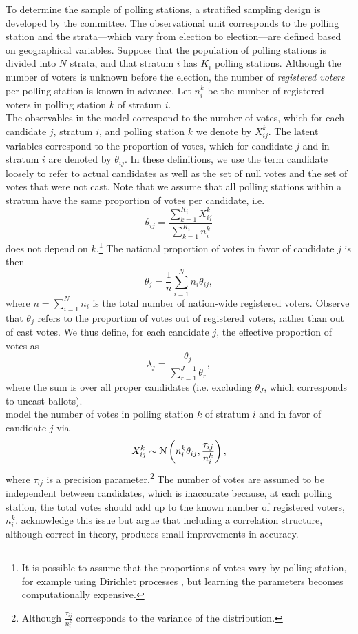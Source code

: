 \documentclass{article}
\begin{document}
To determine the sample of polling stations, a stratified sampling design is developed by the committee. The observational unit corresponds to the polling station and the strata---which vary from election to election---are defined based on geographical variables. Suppose that the population of polling stations is divided into $N$ strata, and that stratum $i$ has $K_i$ polling stations. Although the number of voters is unknown before the election, the number of \textit{registered voters} per polling station is known in advance. Let $n_i^k$ be the number of registered voters in polling station $k$ of stratum $i$. \\

The observables in the model correspond to the number of votes, which for each candidate $j$, stratum $i$, and polling station $k$ we denote by $X_{ij}^k$. The latent variables correspond to the proportion of votes, which for candidate $j$ and in stratum $i$ are denoted by $\theta_{ij}$. In these definitions, we use the term candidate loosely to refer to actual candidates as well as the set of null votes and the set of votes that were not cast. Note that we assume that all polling stations within a stratum have the same proportion of votes per candidate, i.e.
\[
\theta_{ij} = \frac{\sum_{k=1}^{K_i} X_{ij}^k}{\sum_{k=1}^{K_i} n_{i}^k}
\]
does not depend on $k$.\footnote{It is possible to assume that the proportions of votes vary by polling station, for example using Dirichlet processes \citep[see][]{lo1984class, nieto2018}, but learning the parameters becomes computationally expensive.} The national proportion of votes in favor of candidate $j$ is then
\[
  \theta_j = \frac{1}{n} \sum_{i=1}^N n_i \theta_{ij}, \label{eq:thetaj}
\]
where $n = \sum_{i=1}^N n_i$ is the total number of nation-wide registered voters. Observe that $\theta_j$ refers to the proportion of votes out of registered voters, rather than out of cast votes. We thus define, for each candidate $j$, the effective proportion of votes as
\[
  \lambda_j = \frac{\theta_j}{\sum_{r = 1}^{J-1} \theta_r},  \label{eq:lambdaj}
\]
where the sum is over all proper candidates (i.e. excluding $\theta_J$, which corresponds to uncast ballots). \\



\citet{mendoza-nieto2016} model the number of votes in polling station $k$ of stratum $i$ and in favor of candidate $j$ via
\[
  X_{ij}^k \sim \mathcal{N} \left( n_i^k \theta_{ij}, \frac{\tau_{ij}}{n_i^k} \right), \label{eq:original_likelihood}
\]
where $\tau_{ij}$ is a precision parameter.\footnote{Although $\frac{\tau_{ij}}{n_i^k}$ corresponds to the variance of the distribution.}  The number of votes are assumed to be independent between candidates, which is inaccurate because, at each polling station, the total votes should add up to the known number of registered voters, $n_i^k$. \citet{mendoza-nieto2016} acknowledge this issue but argue that including a correlation structure, although correct in theory, produces small improvements in accuracy. \\
\end{document}

